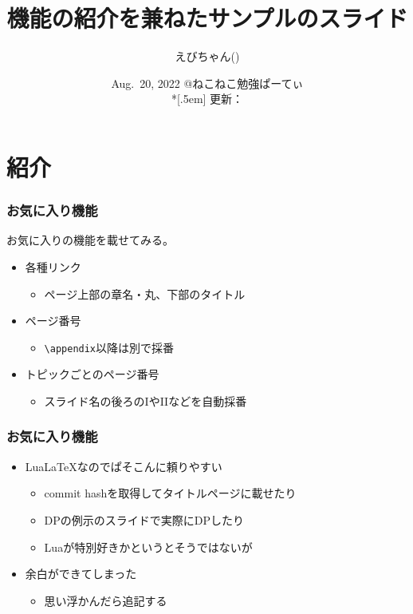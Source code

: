 \documentclass[
  lualatex,
  ja=standard,
  compress,
  hyperref={colorlinks, urlcolor=magenta, linkcolor=blue!55!black},
  dvipsnames,
  svgnames,
]{beamer}
\title{機能の紹介を兼ねたサンプルのスライド}
\author[えびちゃん]{えびちゃん(\hspace{.05em}\textcolor{useryellow}{\lato{\textbf{rsk0315}}}\hspace{.05em})}
\date{Aug.~20, 2022 @ねこねこ勉強ぱーてぃ\\*[.5em]
  {\footnotesize 更新：}\directlua{commit_hash_and_date("\jobname.tex")}}
\begin{document}
\begin{frame}
  \maketitle
\end{frame}

\section{紹介}
\begin{frame}
  \frametitle{お気に入り機能 \theslidetopic}

  お気に入りの機能を載せてみる。

  \begin{itemize}
  \item 各種リンク
    \begin{itemize}
    \item ページ上部の章名・丸、下部のタイトル
    \end{itemize}
  \item ページ番号
    \begin{itemize}
    \item \texttt{\textbackslash appendix}以降は別で採番
    \end{itemize}
  \item トピックごとのページ番号
    \begin{itemize}
    \item スライド名の後ろのIやIIなどを自動採番
    \end{itemize}
  \end{itemize}
\end{frame}

\begin{frame}
  \frametitle{お気に入り機能 \theslidetopic}

  \begin{itemize}
  \item Lua\LaTeX{}なのでぱそこんに頼りやすい
    \begin{itemize}
    \item commit hashを取得してタイトルページに載せたり
    \item DPの例示のスライドで実際にDPしたり
    \item Luaが特別好きかというとそうではないが
    \end{itemize}
  \item 余白ができてしまった
    \begin{itemize}
    \item 思い浮かんだら追記する
    \end{itemize}
  \end{itemize}
\end{frame}
\end{document}
